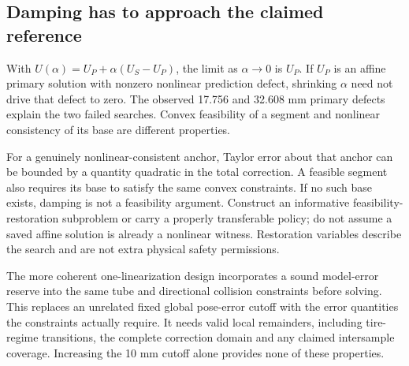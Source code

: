 \documentclass[11pt]{article}
\begin{document}
\subsection{Damping has to approach the claimed reference}
With $U(\alpha)=U_P+\alpha(U_S-U_P)$, the limit as $\alpha\to0$ is $U_P$.
If $U_P$ is an affine primary solution with nonzero nonlinear prediction
defect, shrinking $\alpha$ need not drive that defect to zero. The observed
17.756 and 32.608 mm primary defects explain the two failed searches.
Convex feasibility of a segment and nonlinear consistency of its base are
different properties.

For a genuinely nonlinear-consistent anchor, Taylor error about that anchor
can be bounded by a quantity quadratic in the total correction. A feasible
segment also requires its base to satisfy the same convex constraints.
If no such base exists, damping is not a feasibility argument. Construct an
informative feasibility-restoration subproblem or carry a properly transferable
policy; do not assume a saved affine solution is already a nonlinear witness.
Restoration variables describe the search and are not extra physical safety
permissions.

The more coherent one-linearization design incorporates a sound model-error
reserve into the same tube and directional collision constraints before
solving. This replaces an unrelated fixed global pose-error cutoff with
the error quantities the constraints actually require. It needs valid local
remainders, including tire-regime transitions, the complete correction
domain and any claimed intersample coverage. Increasing the 10 mm cutoff
alone provides none of these properties.
\end{document}
